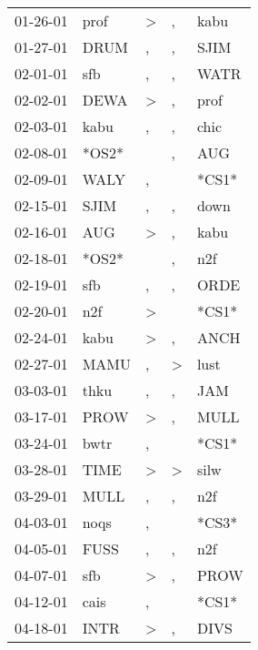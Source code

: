 \begin{supertabular}{lllll}
 01-26-01 &   prof &     \textgreater &                , &   kabu \\
 01-27-01 &   DRUM &                , &                , &   SJIM \\
 02-01-01 &    sfb &                , &                , &   WATR \\
 02-02-01 &   DEWA &     \textgreater &                , &   prof \\
 02-03-01 &   kabu &                , &                , &   chic \\
 02-08-01 &  *OS2* &                  &                , &    AUG \\
 02-09-01 &   WALY &                , &                  &  *CS1* \\
 02-15-01 &   SJIM &                , &                , &   down \\
 02-16-01 &    AUG &     \textgreater &                , &   kabu \\
 02-18-01 &  *OS2* &                  &                , &    n2f \\
 02-19-01 &    sfb &                , &                , &   ORDE \\
 02-20-01 &    n2f &     \textgreater &                  &  *CS1* \\
 02-24-01 &   kabu &     \textgreater &                , &   ANCH \\
 02-27-01 &   MAMU &                , &     \textgreater &   lust \\
 03-03-01 &   thku &                , &                , &    JAM \\
 03-17-01 &   PROW &     \textgreater &                , &   MULL \\
 03-24-01 &   bwtr &                , &                  &  *CS1* \\
 03-28-01 &   TIME &     \textgreater &     \textgreater &   silw \\
 03-29-01 &   MULL &                , &                , &    n2f \\
 04-03-01 &   noqs &                , &                  &  *CS3* \\
 04-05-01 &   FUSS &                , &                , &    n2f \\
 04-07-01 &    sfb &     \textgreater &                , &   PROW \\
 04-12-01 &   cais &                , &                  &  *CS1* \\
 04-18-01 &   INTR &     \textgreater &                , &   DIVS \\

\end{supertabular}
